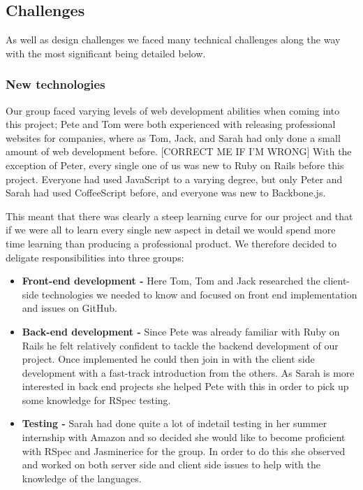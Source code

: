 \subsection{Challenges}
As well as design challenges we faced many technical challenges along the way with the most significant being detailed below.
  \subsubsection{New technologies}
    Our group faced varying levels of web development abilities when coming into this project; Pete and Tom were both experienced with releasing professional websites for companies, where as Tom, Jack, and Sarah had only done a small amount of web development before. [CORRECT ME IF I'M WRONG]
    With the exception of Peter, every single one of us was new to Ruby on Rails before this project. Everyone had used JavaScript to a varying degree, but only Peter and Sarah had used CoffeeScript before, and everyone was new to Backbone.js.

    This meant that there was clearly a steep learning curve for our project and that if we were all to learn every single new aspect in detail we would spend more time learning than producing a professional product.
    We therefore decided to deligate responsibilities into three groups:
    \begin{itemize}
      \item \textbf{Front-end development -} Here Tom, Tom and Jack researched the client-side technologies we needed to know and focused on front end implementation and issues on GitHub.
      \item \textbf{Back-end development -} Since Pete was already familiar with Ruby on Rails he felt relatively confident to tackle the backend development of our project. Once implemented he could then join in with the client side development with a fast-track introduction from the others. As Sarah is more interested in back end projects she helped Pete with this in order to pick up some knowledge for RSpec testing.
      \item \textbf{Testing -} Sarah had done quite a lot of indetail testing in her summer internship with Amazon and so decided she would like to become proficient with RSpec and Jasminerice for the group. In order to do this she observed and worked on both server side and client side issues to help with the knowledge of the languages.
    \end{itemize}

